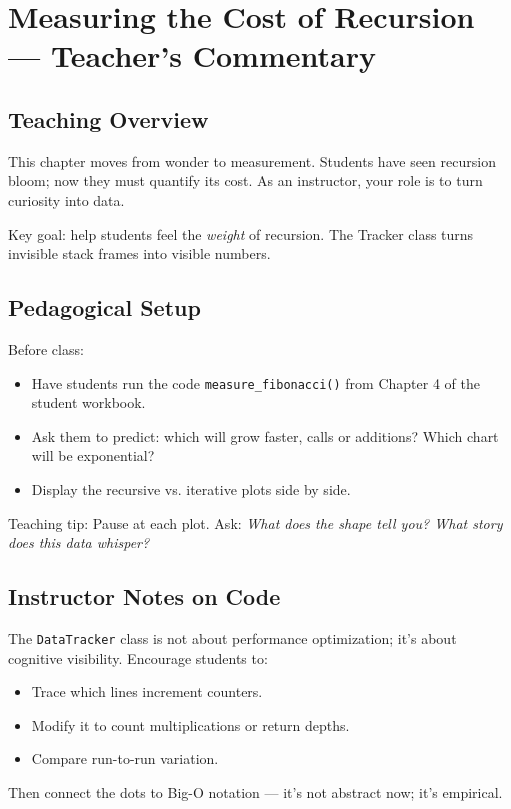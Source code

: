 \chapter{Measuring the Cost of Recursion --- Teacher's Commentary}

\section{Teaching Overview}
This chapter moves from wonder to measurement. Students have seen recursion bloom; now they must quantify its cost. As an instructor, your role is to turn curiosity into data.

Key goal: help students feel the \textit{weight} of recursion. The Tracker class turns invisible stack frames into visible numbers.

\section{Pedagogical Setup}
Before class:
\begin{itemize}
  \item Have students run the code \texttt{measure\_fibonacci()} from Chapter 4 of the student workbook.
  \item Ask them to predict: which will grow faster, calls or additions? Which chart will be exponential?
  \item Display the recursive vs. iterative plots side by side.
\end{itemize}

Teaching tip: Pause at each plot. Ask: \textit{What does the shape tell you? What story does this data whisper?}

\section{Instructor Notes on Code}
The \texttt{DataTracker} class is not about performance optimization; it’s about cognitive visibility.
Encourage students to:
\begin{itemize}
  \item Trace which lines increment counters.
  \item Modify it to count multiplications or return depths.
  \item Compare run-to-run variation.
\end{itemize}

Then connect the dots to Big-O notation — it’s not abstract now; it’s empirical.


